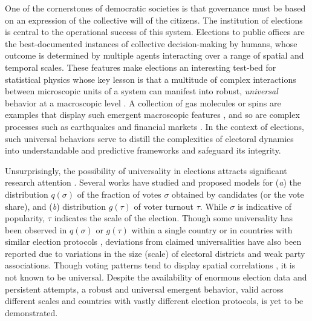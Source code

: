\documentclass[reprint,aps,prl,showpacs,twocolumn, superscriptaddress]{revtex4-2}
\begin{document}
One of the cornerstones of democratic societies is that governance must be based on an expression of the collective will of the citizens. The institution of elections is central to the operational success of this system. Elections to public offices are the best-documented instances of collective decision-making by humans, whose outcome is determined by multiple agents interacting over a range of spatial and temporal scales. These features make elections an interesting test-bed for statistical physics whose key lesson is that a multitude of complex interactions between microscopic units of a system can manifest into robust, {\it universal} behavior at a macroscopic level \cite{anderson1972more,strogatz2022fifty,CasForLor2009, JedSzn2019, MigTor2020, galam2012, brams2008, ForMacRed2013, Bouchaud2023, SenCha2014, PerJorRan2017,JusHolKan2022,redner2019reality}. A collection of gas molecules or spins are examples that display such emergent macroscopic features \cite{REI65}, and so are complex processes such as earthquakes \cite{Corral2004,Corral2006} and financial markets \cite{PleGopRos1999}. In the context of elections, such universal behaviors serve to distill the complexities of electoral dynamics into understandable and predictive frameworks and safeguard its integrity. 

Unsurprisingly, the possibility of universality in elections attracts significant research attention \cite{CosAlmAnd1999, ForCas2007, BorBou2010, mantovani2011scaling, BokSzaVat2018, ChaMitFor2013, hosel2019universality}. Several works have studied and proposed models for ({\it a}) the distribution $q(\sigma)$ of the fraction of votes $\sigma$ obtained by candidates (or the vote share), and ({\it b}) distribution $g(\tau)$ of voter turnout $\tau$. While $\sigma$ is indicative of popularity, $\tau$ indicates the scale of the election. Though some universality has been observed in $q(\sigma)$ or $g(\tau)$ within a single country \cite{ForCas2007,CosAlmAnd1999, BorBou2010} or in countries with similar election protocols \cite{ForCas2007, ChaMitFor2013}, deviations from claimed universalities have also been reported \cite{ChaMitFor2013, Kon2017,Kon2019, CalCroAnt2015, BorRayBou2012} due to variations in the size (scale) of electoral districts and weak party associations. Though voting patterns tend to display spatial correlations \cite{FerSucRam2014, BraDeA2017,MicIlkAtt2021,MorHisNak2019}, it is not known to be universal. Despite the availability of enormous election data and persistent attempts, a robust and universal emergent behavior, valid across different scales and countries with vastly different election protocols, is yet to be demonstrated.
\end{document}
